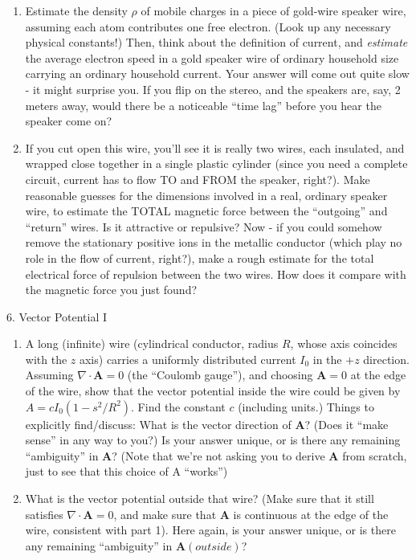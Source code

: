 \documentclass[11pt]{article}
\def\tightlist{}
\begin{document}
\begin{enumerate}
\def\labelenumi{\arabic{enumi}.}
\tightlist
\item
  Estimate the density \(\rho\) of mobile charges in a piece of
  gold-wire speaker wire, assuming each atom contributes one free
  electron. (Look up any necessary physical constants!) Then, think
  about the definition of current, and \emph{estimate} the average
  electron speed in a gold speaker wire of ordinary household size
  carrying an ordinary household current. Your answer will come out
  quite slow - it might surprise you. If you flip on the stereo, and the
  speakers are, say, 2 meters away, would there be a noticeable ``time
  lag'' before you hear the speaker come on?
\item
  If you cut open this wire, you'll see it is really two wires, each
  insulated, and wrapped close together in a single plastic cylinder
  (since you need a complete circuit, current has to flow TO and FROM
  the speaker, right?). Make reasonable guesses for the dimensions
  involved in a real, ordinary speaker wire, to estimate the TOTAL
  magnetic force between the ``outgoing'' and ``return'' wires. Is it
  attractive or repulsive? Now - if you could somehow remove the
  stationary positive ions in the metallic conductor (which play no role
  in the flow of current, right?), make a rough estimate for the total
  electrical force of repulsion between the two wires. How does it
  compare with the magnetic force you just found?
\end{enumerate}

{\Large 6. Vector Potential I}\label{vector-potential-i}

\begin{enumerate}
\def\labelenumi{\arabic{enumi}.}
\tightlist
\item
  A long (infinite) wire (cylindrical conductor, radius \(R\), whose
  axis coincides with the \(z\) axis) carries a uniformly distributed
  current \(I_0\) in the \(+z\) direction. Assuming
  \(\nabla \cdot \mathbf{A} = 0\) (the ``Coulomb gauge''), and choosing
  \(\mathbf{A}=0\) at the edge of the wire, show that the vector
  potential inside the wire could be given by \(A= c I_0(1-s^2/R^2)\).
  Find the constant \(c\) (including units.) Things to explicitly
  find/discuss: What is the vector direction of \(\mathbf{A}\)? (Does it
  ``make sense'' in any way to you?) Is your answer unique, or is there
  any remaining ``ambiguity'' in \(\mathbf{A}\)? (Note that we're not
  asking you to derive \(\mathbf{A}\) from scratch, just to see that
  this choice of A ``works'')
\item
  What is the vector potential outside that wire? (Make sure that it
  still satisfies \(\nabla \cdot \mathbf{A} = 0\), and make sure that
  \(\mathbf{A}\) is continuous at the edge of the wire, consistent with
  part 1). Here again, is your answer unique, or is there any remaining
  ``ambiguity'' in \(\mathbf{A}(outside)\)?
\end{enumerate}
\end{document}
